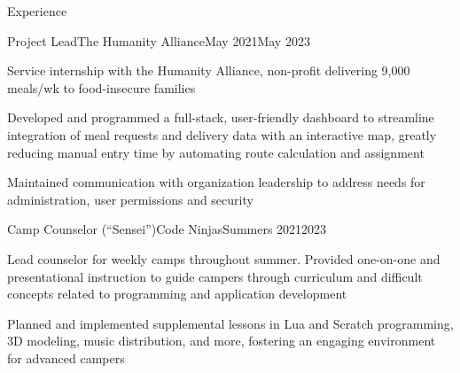 \documentclass{resume} %
\begin{document}
\begin{rSection}{Experience}
  \begin{rItem}{Project Lead}{The Humanity Alliance}{May 2021}{May 2023}
    \item Service internship with the Humanity Alliance, non-profit delivering 9,000 meals/wk to food-insecure families
    \item Developed and programmed a full-stack, user-friendly dashboard to streamline integration of meal requests and delivery data with an interactive map, greatly reducing manual entry time by automating route calculation and assignment
    \item Maintained communication with organization leadership to address needs for  administration, user permissions and security
  \end{rItem}

  \begin{rItem}{Camp Counselor (``Sensei'')}{Code Ninjas}{Summers 2021}{2023}
    \item Lead counselor for weekly camps throughout summer. Provided one-on-one and presentational instruction to guide campers through curriculum and difficult concepts related to programming and application development
    \item Planned and implemented supplemental lessons in Lua and Scratch programming, 3D modeling, music distribution, and more, fostering an engaging environment for advanced campers
  \end{rItem}
\end{rSection}

\end{document}
